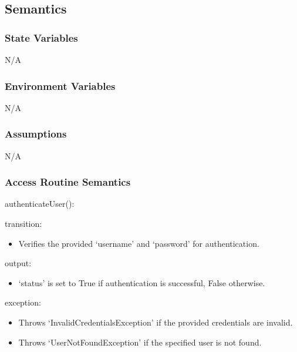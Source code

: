 \documentclass[12pt, titlepage]{article}
\begin{document}
\subsection{Semantics}

\subsubsection{State Variables}
N/A

\subsubsection{Environment Variables}
N/A

\subsubsection{Assumptions}
N/A

\subsubsection{Access Routine Semantics}

\noindent authenticateUser():
\begin{itemize}
  \begin{item}
    transition:
    \begin{itemize}
      \item Verifies the provided `username' and `password' for authentication.
    \end{itemize}
  \end{item}
  \begin{item}
    output:
    \begin{itemize}
      \item `status' is set to True if authentication is successful, False
        otherwise.
    \end{itemize}
  \end{item}
  \begin{item}
    exception:
    \begin{itemize}
      \item Throws `InvalidCredentialsException' if the provided credentials
        are invalid.
      \item Throws `UserNotFoundException' if the specified user is not found.
    \end{itemize}
  \end{item}
\end{itemize}
\end{document}
